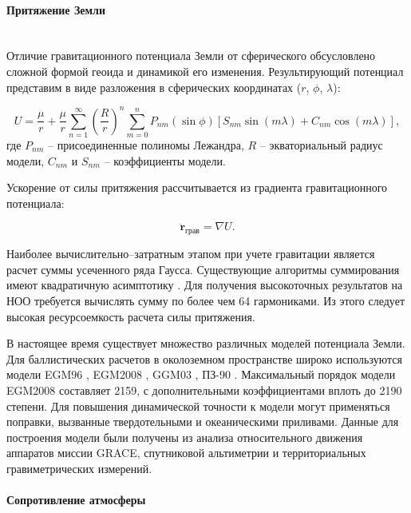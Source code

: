 \paragraph{Притяжение Земли} \mbox{} \\

Отличие гравитационного потенциала Земли от сферического обсусловлено 
сложной формой геоида и динамикой его изменения. Результирующий потенциал представим в виде разложения
в сферических координатах ($r$, $\phi$, $\lambda$):

\begin{equation*}
    U = \frac{\mu}{r} + 
    \frac{\mu}{r} \sum_{n=1}^{\infty} \left(\frac{R}{r}\right)^n 
    \sum_{m=0}^{n} P_{nm}(\sin\phi) \left[ S_{nm} \sin(m \lambda) + C_{nm} \cos(m \lambda) \right],
\end{equation*}
где $P_{nm}$ -- присоединенные полиномы Лежандра, $R$ -- экваториальный радиус модели, 
$C_{nm}$ и $S_{nm}$ -- коэффициенты модели.

Ускорение от силы притяжения рассчитывается из градиента гравитационного потенциала:

\begin{equation*}
    \ddot{\mathbf{r}}_{\text{грав}} = \nabla U.
\end{equation*}

Наиболее вычислительно--затратным этапом при учете гравитации является расчет суммы
усеченного ряда Гаусса. Существующие алгоритмы суммирования имеют квадратичную асимптотику
\cite{Clenshaw1955}.
Для получения высокоточных результатов на НОО требуется вычислять сумму по более чем 64 гармониками.
Из этого следует высокая ресурсоемкость расчета силы притяжения.

В настоящее время существует множество различных моделей потенциала Земли.
Для баллистических расчетов в околоземном пространстве широко используются модели EGM96
\cite{Lemoine1998}, EGM2008 \cite{pavlis2012},
GGM03 \cite{Tapley2007}, ПЗ-90 \cite{Galazin1998}.
Максимальный порядок модели EGM2008 составляет 2159, с дополнительными коэффициентами вплоть до 2190 степени.
Для повышения динамической точности к модели могут применяться поправки, вызванные
твердотельными и океаническими приливами. Данные для построения модели были получены из
анализа относительного движения аппаратов миссии GRACE, спутниковой альтиметрии и 
территориальных гравиметрических измерений. 

\paragraph{Сопротивление атмосферы} \mbox{} \\

